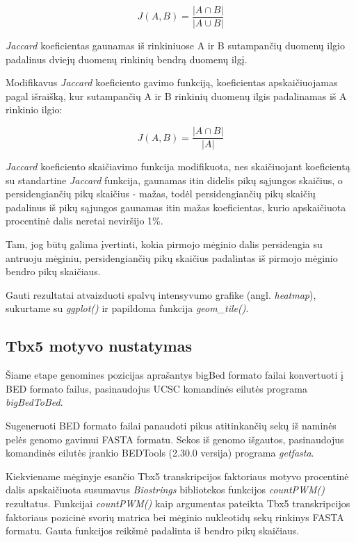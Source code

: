 \documentclass[12pt]{article}
\begin{document}
                \[ J(A, B) =  \frac{|A \cap B|}{|A \cup B|} \]

\emph{Jaccard} koeficientas gaunamas iš rinkiniuose A ir B sutampančių duomenų
ilgio padalinus dviejų duomenų rinkinių bendrą duomenų ilgį.

\newpage

Modifikavus \emph{Jaccard} koeficiento gavimo funkciją, koeficientas
apskaičiuojamas pagal išraišką, kur sutampančių A ir B rinkinių duomenų ilgis
padalinamas iš A rinkinio ilgio:

                    \[ J(A, B) = \frac{|A \cap B|}{|A|} \]

\emph{Jaccard} koeficiento skaičiavimo funkcija modifikuota, nes skaičiuojant
koeficientą su standartine \emph{Jaccard} funkcija, gaunamas itin didelis
pikų sąjungos skaičius, o persidengiančių pikų skaičius - mažas,
todėl persidengiančių pikų skaičių padalinus iš pikų sąjungos gaunamas
itin mažas koeficientas, kurio apskaičiuota procentinė dalis neretai neviršijo
1\%.

Tam, jog būtų galima įvertinti, kokia pirmojo mėginio dalis persidengia su
antruoju mėginiu, persidengiančių pikų skaičius padalintas iš pirmojo
mėginio bendro pikų skaičiaus.

Gauti rezultatai atvaizduoti spalvų intensyvumo grafike (angl. \emph{heatmap}),
sukurtame su \emph{ggplot()} ir papildoma funkcija \emph{geom\_tile()}.

\subsection{Tbx5 motyvo nustatymas}
Šiame etape genomines pozicijas aprašantys bigBed formato failai
konvertuoti į BED formato failus, pasinaudojus UCSC komandinės eilutės programa
\emph{bigBedToBed}\cite{BBTOBED}.

Sugeneruoti BED formato failai panaudoti pikus atitinkančių sekų iš naminės
pelės genomo gavimui FASTA formatu. Sekos iš genomo išgautos, pasinaudojus
komandinės eilutės įrankio BEDTools\cite{BEDTOOLS} (2.30.0 versija) programa
\emph{getfasta}\cite{GET_FASTA}.

Kiekviename mėginyje esančio Tbx5 transkripcijos faktoriaus motyvo procentinė
dalis apskaičiuota susumavus \emph{Biostrings}\cite{BIOSTR} bibliotekos
funkcijos \emph{countPWM()} rezultatus. Funkcijai \emph{countPWM()} kaip
argumentas pateikta Tbx5 transkripcijos faktoriaus pozicinė svorių matrica bei
mėginio nukleotidų sekų rinkinys FASTA formatu. Gauta funkcijos reikšmė
padalinta iš bendro pikų skaičiaus.
\end{document}

